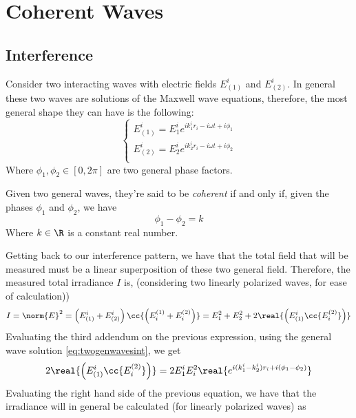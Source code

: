 \documentclass[../electromagnetism.tex]{subfiles}
\begin{document}
\section{Coherent Waves}
\subsection{Interference}
Consider two interacting waves with electric fields $E_{(1)}^i$ and $E_{(2)}^i$. In general these two waves are solutions of the Maxwell wave equations, therefore, the most general shape they can have is the following:
\begin{equation}
	\left\{ \begin{aligned}
			E_{(1)}^i=E_1^ie^{ik_1^ir_i-i\omega t+i\phi_1}\\
			E_{(2)}^i=E_2^ie^{ik_2^ir_i-i\omega t+i\phi_2}\\
	\end{aligned}\right.
	\label{eq:twogenwavesint}
\end{equation}
Where $\phi_1,\phi_2\in[0,2\pi]$ are two general phase factors.\\
\begin{dfn}
	Given two general waves, they're said to be \emph{coherent} if and only if, given the phases $\phi_1$ and $\phi_2$, we have
	\begin{equation}
		\phi_1-\phi_2=k
		\label{eq:coherencedef}
	\end{equation}
	Where $k\in\R$ is a constant real number.
\end{dfn}
Getting back to our interference pattern, we have that the total field that will be measured must be a linear superposition of these two general field. Therefore, the measured total irradiance $I$ is, (considering two linearly polarized waves, for ease of calculation))
\begin{equation*}
	I=\norm{E}^2=\left( E_{(1)}^i+E_{(2)}^i \right)\cc{\left( E^{(1)}_i+E^{(2)}_i \right)}=E_1^2+E_2^2+2\real{\left(E_{(1)}^i\cc{E^{(2)}_i}\right)}
\end{equation*}
Evaluating the third addendum on the previous expression, using the general wave solution \eqref{eq:twogenwavesint}, we get
\begin{equation*}
	2\real{\left(E_{(1)}^i\cc{E_i^{(2)}}\right)}=2E^i_1E_i^2\real{e^{i(k_1^i-k_2^i)r_i+i(\phi_1-\phi_2)}}
\end{equation*}
Evaluating the right hand side of the previous equation, we have that the irradiance will in general be calculated (for linearly polarized waves) as
\end{document}
